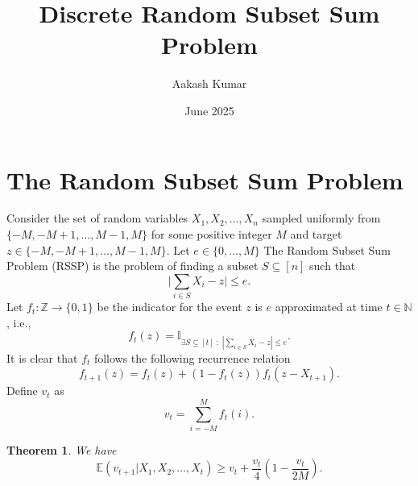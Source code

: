 \documentclass{article}
\title{Discrete Random Subset Sum Problem}
\author{Aakash Kumar}
\date{June 2025}
\newtheorem{theorem}{Theorem}
\begin{document}
\maketitle

\section{The Random Subset Sum Problem}
Consider the set of random variables $X_1,X_2,\dots,X_n$ sampled uniformly from $\{-M,-M+1,\dots,M-1,M\}$ for some positive integer $M$ and target $z\in\{-M,-M+1,\dots,M-1,M\}$. Let $e\in\{0,\dots,M\}$ The Random Subset Sum Problem (RSSP) is the problem of finding a subset $S\subseteq [n]$ such that
\begin{equation*}
    \big|\sum_{i\in S} X_i - z\big|\leq e.
\end{equation*}
Let $f_t:\mathbb{Z}\to\{0,1\}$ be the indicator for the event $z$ is $e$ approximated at time $t\in\mathbb{N}$, i.e.,
\begin{equation*}
    f_t(z) = \mathbb{I}_{\exists S\subseteq [t]\;:\;|\sum_{i\in S}X_i-z|\leq e}.
\end{equation*}
It is clear that $f_t$ follows the following recurrence relation
\begin{equation*}
    f_{t+1}(z)=f_{t}(z)+(1-f_t(z))f_t(z-X_{t+1}).
\end{equation*}
Define $v_t$ as
\begin{equation*}
    v_t=\sum_{i=-M}^M f_t(i).
\end{equation*}
\begin{theorem}
We have
\begin{equation*}
    \mathbb{E}(v_{t+1}|X_1,X_2,\dots,X_t)\geq v_t+\frac{v_t}{4}\left(1-\frac{v_t}{2M}\right).
\end{equation*}
\end{theorem}
\end{document}
